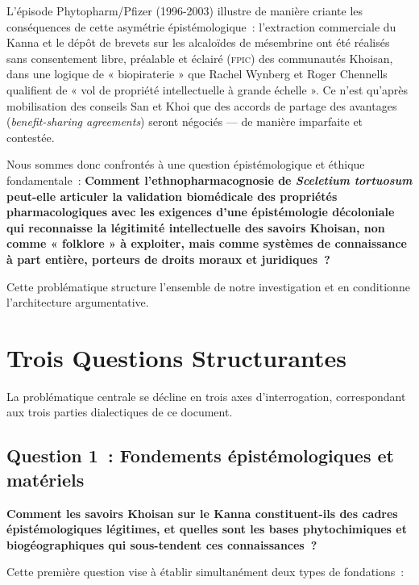 \documentclass[12pt,a4paper,twoside]{book}
\newcommand{\kanna}{\textit{Sceletium tortuosum}}
\newcommand{\fpic}{\textsc{fpic}}
\begin{document}
L'épisode Phytopharm/Pfizer (1996-2003) illustre de manière criante les conséquences de cette asymétrie épistémologique~: l'extraction commerciale du Kanna et le dépôt de brevets sur les alcaloïdes de mésembrine ont été réalisés sans consentement libre, préalable et éclairé (\fpic{}) des communautés Khoisan, dans une logique de « biopiraterie » que Rachel Wynberg et Roger Chennells \parencite{wynberg2009} qualifient de « vol de propriété intellectuelle à grande échelle ». Ce n'est qu'après mobilisation des conseils San et Khoi que des accords de partage des avantages (\textit{benefit-sharing agreements}) seront négociés --- de manière imparfaite et contestée.

Nous sommes donc confrontés à une question épistémologique et éthique fondamentale~: \textbf{Comment l'ethnopharmacognosie de \kanna{} peut-elle articuler la validation biomédicale des propriétés pharmacologiques avec les exigences d'une épistémologie décoloniale qui reconnaisse la légitimité intellectuelle des savoirs Khoisan, non comme « folklore » à exploiter, mais comme systèmes de connaissance à part entière, porteurs de droits moraux et juridiques~?}

Cette problématique structure l'ensemble de notre investigation et en conditionne l'architecture argumentative.

\section{Trois Questions Structurantes}

La problématique centrale se décline en trois axes d'interrogation, correspondant aux trois parties dialectiques de ce document.

\subsection{Question 1~: Fondements épistémologiques et matériels}

\textbf{Comment les savoirs Khoisan sur le Kanna constituent-ils des cadres épistémologiques légitimes, et quelles sont les bases phytochimiques et biogéographiques qui sous-tendent ces connaissances~?}

Cette première question vise à établir simultanément deux types de fondations~:
\end{document}
